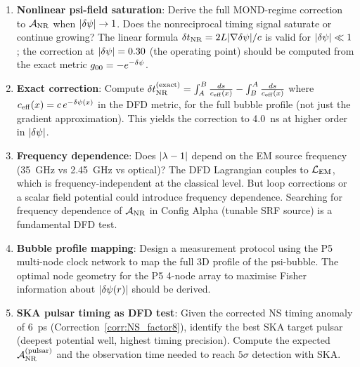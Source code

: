 \begin{enumerate}[nosep, itemsep=4pt]

\item \textbf{Nonlinear psi-field saturation}: Derive the full MOND-regime
correction to $\mathcal{A}_{\rm NR}$ when $|\delta\psi| \to 1$. Does the
nonreciprocal timing signal saturate or continue growing? The linear
formula $\delta t_{\rm NR} = 2L|\nabla\delta\psi|/c$ is valid for $|\delta\psi| \ll 1$;
the correction at $|\delta\psi| = 0.30$ (the operating point) should be computed
from the exact metric $g_{00} = -e^{-\delta\psi}$.

\item \textbf{Exact correction}: Compute
$\delta t_{\rm NR}^{(\rm exact)} = \int_A^B \frac{ds}{c_{\rm eff}(x)}
- \int_B^A \frac{ds}{c_{\rm eff}(x)}$
where $c_{\rm eff}(x) = c\,e^{-\delta\psi(x)}$ in the DFD metric, for the
full bubble profile (not just the gradient approximation). This yields the
correction to 4.0~ns at higher order in $|\delta\psi|$.

\item \textbf{Frequency dependence}: Does $|\lambda - 1|$ depend on the EM
source frequency (35~GHz vs 2.45~GHz vs optical)? The DFD Lagrangian
couples to $\mathcal{L}_{\rm EM}$, which is frequency-independent at
the classical level. But loop corrections or a scalar field potential
could introduce frequency dependence. Searching for frequency dependence
of $\mathcal{A}_{\rm NR}$ in Config Alpha (tunable SRF source) is a
fundamental DFD test.

\item \textbf{Bubble profile mapping}: Design a measurement protocol using
the P5 multi-node clock network to map the full 3D profile of the psi-bubble.
The optimal node geometry for the P5 4-node array to maximise Fisher
information about $|\delta\psi(r)|$ should be derived.

\item \textbf{SKA pulsar timing as DFD test}: Given the corrected NS timing
anomaly of 6~ps (Correction~\ref{corr:NS_factor8}), identify the best SKA
target pulsar (deepest potential well, highest timing precision). Compute
the expected $\mathcal{A}_{\rm NR}^{(\rm pulsar)}$ and the observation time
needed to reach $5\sigma$ detection with SKA.

\end{enumerate}

